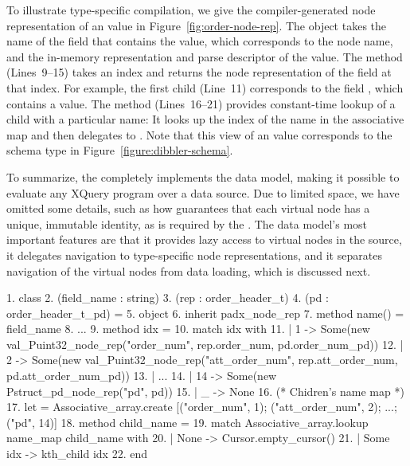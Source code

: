 To illustrate type-specific compilation, we give the
compiler-generated node representation of an 
value in Figure~\ref{fig:order-node-rep}.  The object takes the name
of the field that contains the  value, which
corresponds to the \Xml{} node name, and the in-memory representation
and parse descriptor of the value.  The  method
(Lines~9--15) takes an index and returns the node representation of
the field at that index.  For example, the first child (Line~11)
corresponds to the field , which contains a
 value.  The  method
(Lines~16--21) provides constant-time lookup of a child with a
particular name: It looks up the index of the name in the associative
map  and then delegates to .  Note that
this \Xml{} view of an  value corresponds to the
schema type  in
Figure~\ref{figure:dibbler-schema}.


To summarize, the \padx{} \condm{} completely implements the \Galax{}
data model, making it possible to evaluate any XQuery program over a
\pads{} data source.  Due to limited space, we have omitted some
details, such as how \padx{} guarantees that each virtual node has a
unique, immutable identity, as is required by the \Galax{} \absdm{}.
The data model's most important features are that it provides lazy
access to virtual \Xml{} nodes in the \pads{} source, it delegates
navigation to type-specific node representations, and it separates
navigation of the virtual nodes from data loading, which is discussed
next.

\begin{figure*}
\begin{small}
\begin{code}
{ 1}. class 
{ 2}.       (field\_name : string)
{ 3}.       (rep : order\_header\_t)
{ 4}.       (pd  : order\_header\_t\_pd) = 
{ 5}. object 
{ 6}.   inherit padx\_node\_rep
{ 7}.   method name() = field\_name
{ 8}.   ... 
{ 9}.   method  idx = 
{10}.     match idx with 
{11}.     |  1 -> Some(new val\_Puint32\_node\_rep("order\_num", rep.order\_num, pd.order\_num\_pd))
{12}.     |  2 -> Some(new val\_Puint32\_node\_rep("att\_order\_num", rep.att\_order\_num, pd.att\_order\_num\_pd))
{13}.     | ...
{14}.     | 14 -> Some(new Pstruct\_pd\_node\_rep("pd", pd))
{15}.     | _  -> None
\mbox{}
{16}.   (* Chidren's name map *)
{17}.   let  = Associative\_array.create [("order\_num", 1); ("att\_order\_num", 2); ...; ("pd", 14)] 
{18}.   method  child\_name =
{19}.     match Associative\_array.lookup name\_map child\_name with
{20}.     | None -> Cursor.empty_cursor()
{21}.     | Some idx -> kth_child idx 
{22}. end
\end{code}
\end{small}
\caption{Fragment of compiler-generated node representation for \texttt{order\_header\_t}}
\label{fig:order-node-rep}
\end{figure*}


